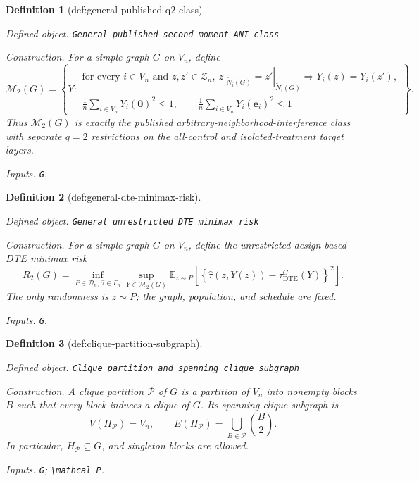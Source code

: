 \documentclass{article}
\newtheorem{definition}{Definition}
\begin{document}
\begin{definition}[def:general-published-q2-class]\label{def:general-published-q2-class}
\par\smallskip\noindent\emph{Defined object.} \texttt{General published second-\allowbreak{}moment ANI class}
\par\smallskip\noindent\emph{Construction.} For a simple graph \(G\) on \(V_n\), define
\[
\mathcal M_2(G)=\left\{Y:\begin{array}{l}
\text{for every }i\in V_n\text{ and }z,z'\in\mathcal Z_n,
\ z|_{\widetilde N_i(G)}=z'|_{\widetilde N_i(G)}\Rightarrow Y_i(z)=Y_i(z'),\\[2mm]
\displaystyle \frac1n\sum_{i\in V_n}Y_i(\mathbf 0)^2\leq1,
\qquad
\displaystyle \frac1n\sum_{i\in V_n}Y_i(\mathbf e_i)^2\leq1
\end{array}\right\}.
\]
Thus \(\mathcal M_2(G)\) is exactly the published arbitrary-neighborhood-interference class with separate \(q=2\) restrictions on the all-control and isolated-treatment target layers.
\par\smallskip\noindent\emph{Inputs.} \texttt{G}.
\end{definition}

\begin{definition}[def:general-dte-minimax-risk]\label{def:general-dte-minimax-risk}
\par\smallskip\noindent\emph{Defined object.} \texttt{General unrestricted DTE minimax risk}
\par\smallskip\noindent\emph{Construction.} For a simple graph \(G\) on \(V_n\), define the unrestricted design-based DTE minimax risk
\[
R_2(G)=\inf_{P\in\mathcal D_n,\,\widehat\tau\in\Gamma_n}
\sup_{Y\in\mathcal M_2(G)}
\mathbb E_{z\sim P}\!\left[
\left\{\widehat\tau(z,Y(z))-\tau_{\mathrm{DTE}}^G(Y)\right\}^2
\right].
\]
The only randomness is \(z\sim P\); the graph, population, and schedule are fixed.
\par\smallskip\noindent\emph{Inputs.} \texttt{G}.
\end{definition}

\begin{definition}[def:clique-partition-subgraph]\label{def:clique-partition-subgraph}
\par\smallskip\noindent\emph{Defined object.} \texttt{Clique partition and spanning clique subgraph}
\par\smallskip\noindent\emph{Construction.} A clique partition \(\mathcal P\) of \(G\) is a partition of \(V_n\) into nonempty blocks \(B\) such that every block induces a clique of \(G\). Its spanning clique subgraph is
\[
V(H_{\mathcal P})=V_n,
\qquad
E(H_{\mathcal P})=\bigcup_{B\in\mathcal P}\binom{B}{2}.
\]
In particular, \(H_{\mathcal P}\subseteq G\), and singleton blocks are allowed.
\par\smallskip\noindent\emph{Inputs.} \texttt{G}; \texttt{\textbackslash{}\allowbreak{}mathcal P}.
\end{definition}
\end{document}
